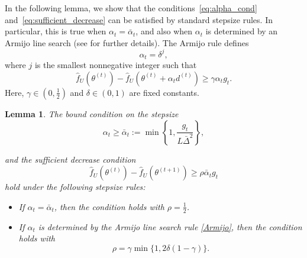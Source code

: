 \documentclass{article}
\newtheorem{Lemma}[Th]{Lemma}
\begin{document}
In the following lemma, we show that the conditions~\eqref{eq:alpha_cond} and~\eqref{eq:sufficient_decrease} 
can be satisfied by
standard stepsize rules. In particular, this is true when \(\alpha_t=\bar\alpha_t\), and also
when \(\alpha_t\) is determined by an Armijo line search (see \cite{bomze2020active,bomze2021frank} for further details). The Armijo rule defines
\begin{equation}\label{eta}
    \alpha_t=\delta^j,
\end{equation}
where \(j\) is the smallest nonnegative integer such that
\begin{equation}\label{Armijo}
    \widehat f_U(\theta^{(t)})
    -
    \widehat f_U(\theta^{(t)}+\alpha_t d^{(t)})
    \ge
    \gamma \alpha_t g_t.
\end{equation}
Here, \(\gamma\in(0,\tfrac12)\) and \(\delta\in(0,1)\) are fixed constants.

\begin{Lemma}\label{stepsize}
The bound condition on the stepsize
\begin{equation}\label{eq:1lb}
    \alpha_t \geq
    \bar\alpha_t
    :=
    \min\left\{
        1,
        \frac{g_t}{L\bar\Delta^2}
    \right\} ,
\end{equation}

and the sufficient decrease condition
\begin{equation}\label{eq:2ar}
    \widehat f_U(\theta^{(t)})
    -
    \widehat f_U(\theta^{(t+1)})
    \ge
    \rho \bar\alpha_t g_t
\end{equation}
hold under the following stepsize rules:
\begin{itemize}
\item If \(\alpha_t=\bar\alpha_t\), then the condition holds
with \(\rho=\frac12\). 
\item If \(\alpha_t\) is determined by the Armijo line search rule
\eqref{Armijo}, then the condition holds with
\[
    \rho=\gamma\min\{1,2\delta(1-\gamma)\}.
\]
\end{itemize}
\end{Lemma}
\end{document}
